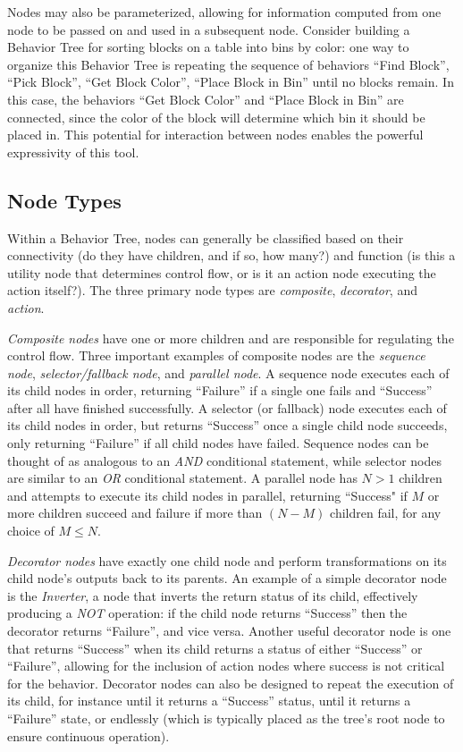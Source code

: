 Nodes may also be parameterized, allowing for information computed from one node to be passed on and used in a subsequent node. Consider building a Behavior Tree for sorting blocks on a table into bins by color: one way to organize this Behavior Tree is repeating the sequence of behaviors ``Find Block'', ``Pick Block'', ``Get Block Color'', ``Place Block in Bin'' until no blocks remain. In this case, the behaviors ``Get Block Color'' and ``Place Block in Bin'' are connected, since the color of the block will determine which bin it should be placed in. This potential for interaction between nodes enables the powerful expressivity of this tool.

\subsection{Node Types}
Within a Behavior Tree, nodes can generally be classified based on their connectivity (do they have children, and if so, how many?) and function (is this a utility node that determines control flow, or is it an action node executing the action itself?). The three primary node types are \textsl{composite}, \textsl{decorator}, and \textsl{action}.

\textsl{Composite nodes} have one or more children and are responsible for regulating the control flow. Three important examples of composite nodes are the \textsl{sequence node}, \textsl{selector/fallback node}, and \textsl{parallel node}. A sequence node executes each of its child nodes in order, returning ``Failure'' if a single one fails and ``Success'' after all have finished successfully. A selector (or fallback) node executes each of its child nodes in order, but returns ``Success'' once a single child node succeeds, only returning ``Failure'' if all child nodes have failed. Sequence nodes can be thought of as analogous to an \textsl{AND} conditional statement, while selector nodes are similar to an \textsl{OR} conditional statement. A parallel node has $N>1$ children and attempts to execute its child nodes in parallel, returning ``Success" if $M$ or more children succeed and failure if more than $(N-M)$ children fail, for any choice of $M\leq N$.

\textsl{Decorator nodes} have exactly one child node and perform transformations on its child node's outputs back to its parents. An example of a simple decorator node is the \textsl{Inverter}, a node that inverts the return status of its child, effectively producing a \textsl{NOT} operation: if the child node returns ``Success'' then the decorator returns ``Failure'', and vice versa. Another useful decorator node is one that returns ``Success'' when its child returns a status of either ``Success'' or ``Failure'', allowing for the inclusion of action nodes where success is not critical for the behavior. Decorator nodes can also be designed to repeat the execution of its child, for instance until it returns a ``Success'' status, until it returns a ``Failure'' state, or endlessly (which is typically placed as the tree's root node to ensure continuous operation).

